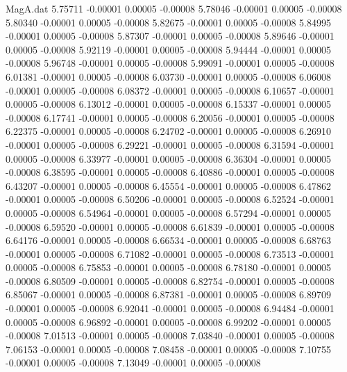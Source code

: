 \begin{filecontents}{MagA.dat}
   5.75711   -0.00001    0.00005   -0.00008
   5.78046   -0.00001    0.00005   -0.00008
   5.80340   -0.00001    0.00005   -0.00008
   5.82675   -0.00001    0.00005   -0.00008
   5.84995   -0.00001    0.00005   -0.00008
   5.87307   -0.00001    0.00005   -0.00008
   5.89646   -0.00001    0.00005   -0.00008
   5.92119   -0.00001    0.00005   -0.00008
   5.94444   -0.00001    0.00005   -0.00008
   5.96748   -0.00001    0.00005   -0.00008
   5.99091   -0.00001    0.00005   -0.00008
   6.01381   -0.00001    0.00005   -0.00008
   6.03730   -0.00001    0.00005   -0.00008
   6.06008   -0.00001    0.00005   -0.00008
   6.08372   -0.00001    0.00005   -0.00008
   6.10657   -0.00001    0.00005   -0.00008
   6.13012   -0.00001    0.00005   -0.00008
   6.15337   -0.00001    0.00005   -0.00008
   6.17741   -0.00001    0.00005   -0.00008
   6.20056   -0.00001    0.00005   -0.00008
   6.22375   -0.00001    0.00005   -0.00008
   6.24702   -0.00001    0.00005   -0.00008
   6.26910   -0.00001    0.00005   -0.00008
   6.29221   -0.00001    0.00005   -0.00008
   6.31594   -0.00001    0.00005   -0.00008
   6.33977   -0.00001    0.00005   -0.00008
   6.36304   -0.00001    0.00005   -0.00008
   6.38595   -0.00001    0.00005   -0.00008
   6.40886   -0.00001    0.00005   -0.00008
   6.43207   -0.00001    0.00005   -0.00008
   6.45554   -0.00001    0.00005   -0.00008
   6.47862   -0.00001    0.00005   -0.00008
   6.50206   -0.00001    0.00005   -0.00008
   6.52524   -0.00001    0.00005   -0.00008
   6.54964   -0.00001    0.00005   -0.00008
   6.57294   -0.00001    0.00005   -0.00008
   6.59520   -0.00001    0.00005   -0.00008
   6.61839   -0.00001    0.00005   -0.00008
   6.64176   -0.00001    0.00005   -0.00008
   6.66534   -0.00001    0.00005   -0.00008
   6.68763   -0.00001    0.00005   -0.00008
   6.71082   -0.00001    0.00005   -0.00008
   6.73513   -0.00001    0.00005   -0.00008
   6.75853   -0.00001    0.00005   -0.00008
   6.78180   -0.00001    0.00005   -0.00008
   6.80509   -0.00001    0.00005   -0.00008
   6.82754   -0.00001    0.00005   -0.00008
   6.85067   -0.00001    0.00005   -0.00008
   6.87381   -0.00001    0.00005   -0.00008
   6.89709   -0.00001    0.00005   -0.00008
   6.92041   -0.00001    0.00005   -0.00008
   6.94484   -0.00001    0.00005   -0.00008
   6.96892   -0.00001    0.00005   -0.00008
   6.99202   -0.00001    0.00005   -0.00008
   7.01513   -0.00001    0.00005   -0.00008
   7.03840   -0.00001    0.00005   -0.00008
   7.06153   -0.00001    0.00005   -0.00008
   7.08458   -0.00001    0.00005   -0.00008
   7.10755   -0.00001    0.00005   -0.00008
   7.13049   -0.00001    0.00005   -0.00008

\end{filecontents}
